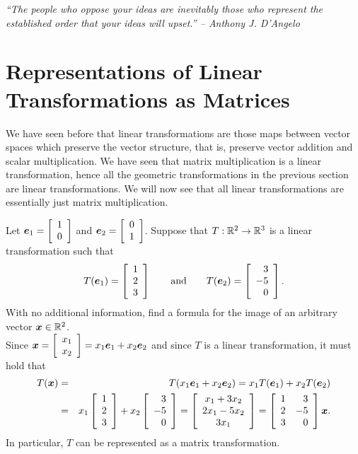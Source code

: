 
\begin{center} 
\emph{``The people who oppose your ideas are inevitably those who represent the established order that your ideas will upset.'' -- Anthony J. D'Angelo}
\end{center}

\section{Representations of Linear Transformations as Matrices}\label{sec:representation}
We have seen before that linear transformations are those maps between vector spaces which preserve the vector structure, that is, preserve vector addition and scalar multiplication. We have seen that matrix multiplication is a linear transformation, hence all the geometric transformations in the previous section are linear transformations. We will now see that all linear transformations are essentially just matrix multiplication. \\

\begin{Exam}
Let $\bb e_1 = \vr{1\\0}$ and $\bb e_2 = \vr{0\\1}$. Suppose that $T : \R^2 \to \R^3$ is a linear transformation such that \[T(\bb e_1) = \vr{1\\2\\3}\qquad\text{and}\qquad T(\bb e_2) = \vr{3\\-5\\0}.\] With no additional information, find a formula for the image of an arbitrary vector $\bb x \in \R^2$.\\

Since $\bb x = \vr{x_1 \\ x_2} = x_1\bb e_1 + x_2\bb e_2$ and since $T$ is a linear transformation, it must hold that 
\begin{eqnarray*}
T(\bb x) &=& T(x_1\bb e_1 + x_2\bb e_2) = x_1T(\bb e_1) + x_2T(\bb e_2)\\
&=& x_1\vr{1\\2\\3} + x_2\vr{3\\-5\\0} = \mtx{c}{x_1+3x_2\\ 2x_1-5x_2 \\ 3x_1} = \mtx{rr}{1&3\\2&-5\\3&0}\bb x.
\end{eqnarray*} In particular, $T$ can be represented as a matrix transformation.
\end{Exam}\vs

